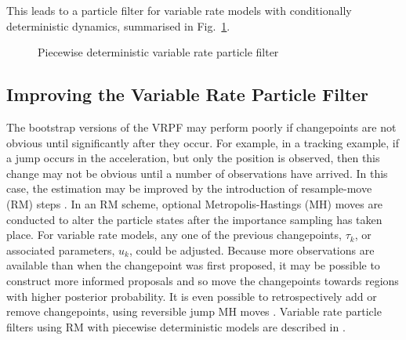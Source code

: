 \documentclass[journal]{IEEEtran}
\begin{document}
This leads to a particle filter for variable rate models with conditionally deterministic dynamics, summarised in Fig.~\ref{alg:VRPF}.%

\begin{figure}
\caption{Piecewise deterministic variable rate particle filter}
\label{alg:VRPF}
\end{figure}



\subsection{Improving the Variable Rate Particle Filter}

The bootstrap versions of the VRPF may perform poorly if changepoints are not obvious until significantly after they occur. For example, in a tracking example, if a jump occurs in the acceleration, but only the position is observed, then this change may not be obvious until a number of observations have arrived. In this case, the estimation may be improved by the introduction of resample-move (RM) steps \cite{Gilks2001}. In an RM scheme, optional Metropolis-Hastings (MH) moves are conducted to alter the particle states after the importance sampling has taken place. For variable rate models, any one of the previous changepoints, $\tau_k$, or associated parameters, $u_k$, could be adjusted. Because more observations are available than when the changepoint was first proposed, it may be possible to construct more informed proposals and so move the changepoints towards regions with higher posterior probability. It is even possible to retrospectively add or remove changepoints, using reversible jump MH moves \cite{Green1995}. Variable rate particle filters using RM with piecewise deterministic models are described in \cite{Whiteley2011,Gilholm2008}.
\end{document}
